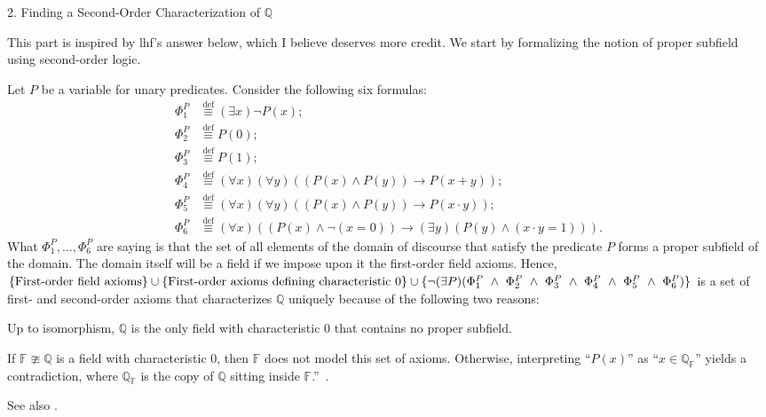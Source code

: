 2. Finding a Second-Order Characterization of $ \mathbb{Q} $

This part is inspired by lhf's answer below, 
which I believe deserves more credit. 
We start by formalizing the notion of proper subfield 
using second-order logic.

Let $ P $ be a variable for unary predicates. 
Consider the following six formulas: 
\begin{align} 
\Phi^{P}_{1} &\stackrel{\text{def}}{\equiv} 
(\exists x) \neg P(x); 
\\ \Phi^{P}_{2} &\stackrel{\text{def}}{\equiv} P(0); 
\\ \Phi^{P}_{3} &\stackrel{\text{def}}{\equiv} P(1); 
\\ \Phi^{P}_{4} &\stackrel{\text{def}}{\equiv} 
(\forall x)(\forall y)((P(x) \land P(y)) 
\rightarrow P(x + y)); \\ \Phi^{P}_{5} 
&\stackrel{\text{def}}{\equiv} 
(\forall x)(\forall y)
((P(x) 
\land P(y)) \rightarrow P(x \cdot y));
\\ \Phi^{P}_{6} 
&\stackrel{\text{def}}{\equiv} 
(\forall x)((P(x) \land \neg (x = 0)) \rightarrow
(\exists y)(P(y) \land (x \cdot y = 1))). 
\end{align} 
What $ \Phi^{P}_{1},\ldots,\Phi^{P}_{6} $ are saying is that 
the set of all elements of the domain of discourse 
that satisfy the predicate $ P $ 
forms a proper subfield of the domain. 
The domain itself will be a field 
if we impose upon it the first-order field axioms. 
Hence, 
$ \{ \text{First-order field axioms} \} 
\cup 
\{ \text{First-order axioms defining characteristic $ 0 $} \}
 \cup
\{ \neg (\exists P)(\Phi^{P}_{1} 
~ \land ~ \Phi^{P}_{2} ~ \land ~ 
\Phi^{P}_{3} ~ \land ~ 
\Phi^{P}_{4} ~ \land ~ 
\Phi^{P}_{5} ~ \land ~ \Phi^{P}_{6}) \} $
is a set of first- and second-order axioms that characterizes
$ \mathbb{Q} $ uniquely because of the following two reasons:

Up to isomorphism, 
$ \mathbb{Q} $ is the only field with characteristic $ 0 $ 
that contains no proper subfield.

If $ \mathbb{F} \ncong \mathbb{Q} $ is 
a field with characteristic $ 0 $, 
then $ \mathbb{F} $ does not model this set of axioms. 
Otherwise, interpreting “$ P(x) $” as 
“$ x \in \mathbb{Q}_{\mathbb{F}} $” yields a contradiction, 
where $ \mathbb{Q}_{\mathbb{F}} $ is the copy of $ \mathbb{Q} $ 
sitting inside 
$ \mathbb{F} $.''~\cite{stackexchange:Rational_axioms}.


See also \cite{physics_insights:Rationals}.

